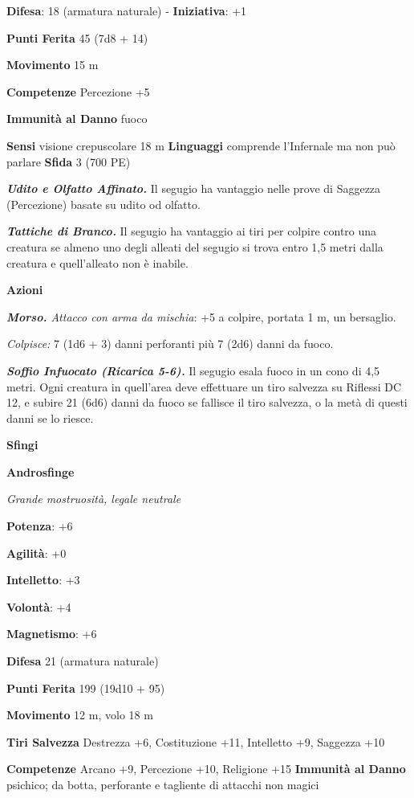\begin{multicols}{2}
\textbf{Difesa}: 18 (armatura naturale) - \textbf{Iniziativa}: +1

\textbf{Punti Ferita} 45 (7d8 + 14)

\textbf{Movimento} 15 m

\textbf{Competenze} Percezione +5

\textbf{Immunità al Danno} fuoco

\textbf{Sensi} visione crepuscolare 18 m
\textbf{Linguaggi} comprende l'Infernale ma non può parlare
\textbf{Sfida} 3 (700 PE)\smallskip

\emph{\textbf{Udito e Olfatto Affinato.}} Il segugio ha vantaggio nelle
prove di Saggezza (Percezione) basate su udito od olfatto.

\emph{\textbf{Tattiche di Branco.}} Il segugio ha vantaggio ai tiri per
colpire contro una creatura se almeno uno degli alleati del segugio si
trova entro 1,5 metri dalla creatura e quell'alleato non è inabile.

\smallskip\textbf{Azioni}

\emph{\textbf{Morso.} Attacco con arma da mischia}: +5 a colpire,
portata 1 m, un bersaglio.

\emph{Colpisce:} 7 (1d6 + 3) danni perforanti più 7 (2d6) danni da
fuoco.

\emph{\textbf{Soffio Infuocato (Ricarica 5-6).}} Il segugio esala fuoco
in un cono di 4,5 metri. Ogni creatura in quell'area deve effettuare un
tiro salvezza su Riflessi DC 12, e subire 21 (6d6) danni da fuoco se
fallisce il tiro salvezza, o la metà di questi danni se lo riesce.



\textbf{Sfingi}

\textbf{Androsfinge}

\emph{Grande mostruosità, legale neutrale}

\textbf{Potenza}: +6

\textbf{Agilità}: +0

\textbf{Intelletto}: +3

\textbf{Volontà}: +4

\textbf{Magnetismo}: +6

\textbf{Difesa} 21 (armatura naturale)

\textbf{Punti Ferita} 199 (19d10 + 95)

\textbf{Movimento} 12 m, volo 18 m

\textbf{Tiri Salvezza} Destrezza +6, Costituzione +11, Intelletto +9,
Saggezza +10

\textbf{Competenze} Arcano +9, Percezione +10, Religione +15
\textbf{Immunità al Danno} psichico; da botta, perforante e tagliente
di attacchi non magici


\end{multicols}
